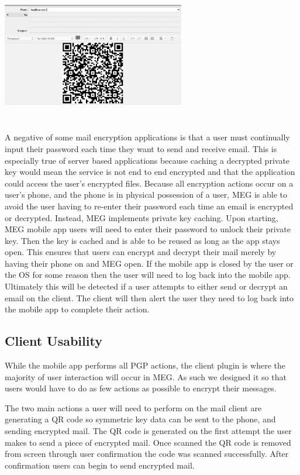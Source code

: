 \documentclass[10pt]{article}
\begin{document}
\begin{multicols}{2}
\begin{center}
\includegraphics[width=8cm,height=6cm]{qr-code-thunderbird.png}
\label{fig:qr}
\end{center}
\par A negative of some mail encryption applications is that a user must continually input their password each time they want to send and receive email. This is especially true of server based applications because caching a decrypted private key would mean the service is not end to end encrypted and that the application could access the user's encrypted files. Because all encryption actions occur on a user's phone, and the phone is in physical possession of a user, MEG is able to avoid the user having to re-enter their password each time an email is encrypted or decrypted. Instead, MEG implements private key caching. Upon starting, MEG mobile app users will need to enter their password to unlock their private key. Then the key is cached and is able to be reused as long as the app stays open. This ensures that users can encrypt and decrypt their mail merely by having their phone on and MEG open. If the mobile app is closed by the user or the OS for some reason then the user will need to log back into the mobile app. Ultimately this will be detected if a user attempts to either send or decrypt an email on the client. The client will then alert the user they need to log back into the mobile app to complete their action.
\subsection{Client Usability}
\par While the mobile app performs all PGP actions, the client plugin is where the majority of user interaction will occur in MEG. As such we designed it so that users would have to do as few actions as possible to encrypt their messages.
\par The two main actions a user will need to perform on the mail client are generating a QR code so symmetric key data can be sent to the phone, and sending encrypted mail. The QR code is generated on the first attempt the user makes to send a piece of encrypted mail. Once scanned the QR code is removed from screen through user confirmation the code was scanned successfully. After confirmation users can begin to send encrypted mail.
\end{multicols}
\end{document}
